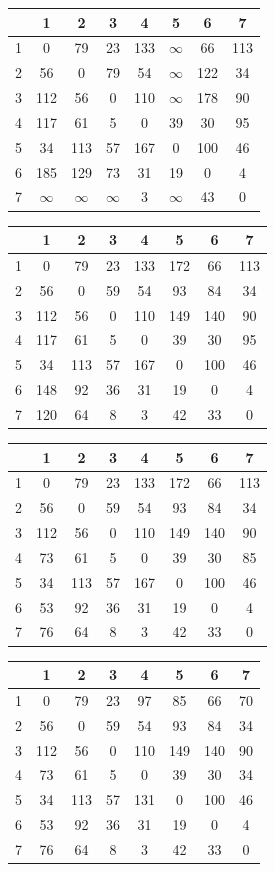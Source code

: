 \documentclass[russian]{article}
\begin{document}
\begin{tabular}{|c|c|c|c|c|c|c|c|}\hline
& 1& 2& 3& 4& 5& 6& 7\\\hline
1&0&79&23&133&$\infty$&66&113\\\hline
2&56&0&79&54&$\infty$&122&34\\\hline
3&112&56&0&110&$\infty$&178&90\\\hline
4&117&61&5&0&39&30&95\\\hline
5&34&113&57&167&0&100&46\\\hline
6&185&129&73&31&19&0&4\\\hline
7&$\infty$&$\infty$&$\infty$&3&$\infty$&43&0\\\hline
\end{tabular}

\begin{tabular}{|c|c|c|c|c|c|c|c|}\hline
& 1& 2& 3& 4& 5& 6& 7\\\hline
1&0&79&23&133&172&66&113\\\hline
2&56&0&59&54&93&84&34\\\hline
3&112&56&0&110&149&140&90\\\hline
4&117&61&5&0&39&30&95\\\hline
5&34&113&57&167&0&100&46\\\hline
6&148&92&36&31&19&0&4\\\hline
7&120&64&8&3&42&33&0\\\hline
\end{tabular}

\begin{tabular}{|c|c|c|c|c|c|c|c|}\hline
& 1& 2& 3& 4& 5& 6& 7\\\hline
1&0&79&23&133&172&66&113\\\hline
2&56&0&59&54&93&84&34\\\hline
3&112&56&0&110&149&140&90\\\hline
4&73&61&5&0&39&30&85\\\hline
5&34&113&57&167&0&100&46\\\hline
6&53&92&36&31&19&0&4\\\hline
7&76&64&8&3&42&33&0\\\hline
\end{tabular}

\begin{tabular}{|c|c|c|c|c|c|c|c|}\hline
& 1& 2& 3& 4& 5& 6& 7\\\hline
1&0&79&23&97&85&66&70\\\hline
2&56&0&59&54&93&84&34\\\hline
3&112&56&0&110&149&140&90\\\hline
4&73&61&5&0&39&30&34\\\hline
5&34&113&57&131&0&100&46\\\hline
6&53&92&36&31&19&0&4\\\hline
7&76&64&8&3&42&33&0\\\hline
\end{tabular}
\end{document}
